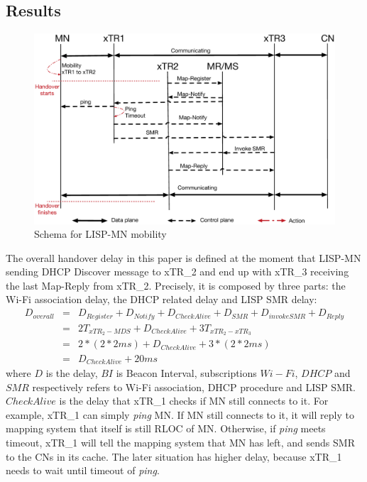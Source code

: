 \subsection{Results}
\label{sec:ns3_results_xTR}

\begin{figure}[!th]
	\centering
	\includegraphics[width=\textwidth]{Pics/Mobility_xTR_schema_SMR_simplify}
	\caption{Schema for LISP-MN mobility}
	\label{sim_schema}
\end{figure}

The overall handover delay in this paper is defined at the moment that LISP-MN sending DHCP Discover message to xTR\_2 and end up with xTR\_3 receiving the last Map-Reply from xTR\_2. Precisely, it is composed by three parts: the Wi-Fi association delay, the DHCP related delay and LISP SMR delay:
\begin{eqnarray}
D_{overall} &=& D_{Register} + D_{Notify} + D_{CheckAlive} + D_{SMR} + D_{invokeSMR} + D_{Reply} \nonumber \\
&=& 2T_{xTR_2-MDS} + D_{CheckAlive} + 3T_{xTR_2-xTR_3} \nonumber \\
&=& 2* (2*2ms) + D_{CheckAlive} + 3*(2*2ms) \nonumber \\
&=& D_{CheckAlive} + 20 ms
\end{eqnarray}
where $D$ is the delay, $BI$ is Beacon Interval, subscriptions $Wi-Fi$, $DHCP$ and $SMR$ respectively refers to Wi-Fi association, DHCP procedure and LISP SMR. $CheckAlive$ is the delay that xTR\_1 checks if MN still connects to it. For example, xTR\_1 can simply \emph{ping} MN. If MN still connects to it, it will reply to mapping system that itself is still RLOC of MN. Otherwise, if \emph{ping} meets timeout, xTR\_1 will tell the mapping system that MN has left, and sends SMR to the CNs in its cache. The later situation has higher delay, because xTR\_1 needs to wait until timeout of \emph{ping}.


